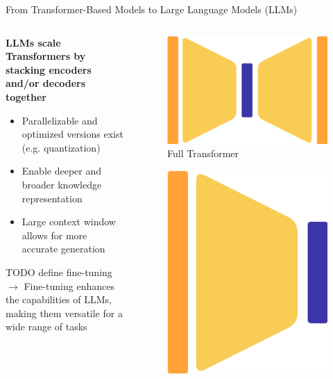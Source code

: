 \documentclass[11pt,aspectratio=169]{beamer}
\begin{document}
\begin{frame}{From Transformer-Based Models to Large Language Models (LLMs)}

\begin{columns}
    \begin{column}{0.7\linewidth}
        \vspace{-0.3cm}
        \begin{center}
        \textbf{LLMs scale Transformers by stacking encoders and/or decoders together}
        \end{center}
        \vspace{0.6cm}
        \begin{itemize}
            \item Parallelizable and optimized versions exist (e.g. quantization)
            \item Enable deeper and broader knowledge representation
            \item Large context window allows for more accurate generation
        \end{itemize}
    \vspace{0.6cm}
    TODO define fine-tuning\\
    $\longrightarrow$ Fine-tuning enhances the capabilities of LLMs, making them versatile for a wide range of tasks
    \end{column}
    \begin{column}{0.3\linewidth}
        \begin{figure}
            \includegraphics[width=0.45\linewidth]{ed_encoder_decoder.png}
            \caption{\centering\footnotesize Full Transformer}
        \end{figure}
        \vspace{-0.6cm}
        \begin{figure}
            \includegraphics[width=0.24\linewidth]{ed_encoder_only.png}

\end{figure}
\end{column}
\end{columns}
\end{frame}
\end{document}
